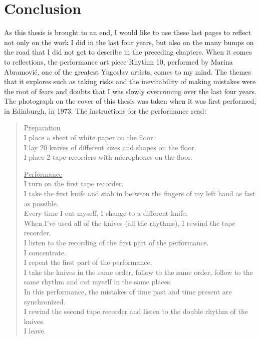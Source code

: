 \chapter{Conclusion}
\label{ch:conclusion}
 
As this thesis is brought to an end, I would like to use these last pages to
reflect not only on the work I did in the last four years, but also on the
many bumps on the road that I did not get to describe in the preceding chapters.
When it comes to reflections, the  performance art piece Rhythm 10, performed by
Marina Abramovi\'c,  one of the greatest Yugoslav artists, comes to my mind. The
themes that it explores such as taking risks and the inevitability of making
mistakes were the root of fears and doubts that I was slowly overcoming over the
last four years. The photograph on the cover of this thesis was taken when it
was first performed, in Edinburgh, in 1973. The instructions for the performance read:

\begin{quote}
    \underline{Preparation} \\[1\jot]
    I place a sheet of white paper on the floor.\\
    I lay 20 knives of different sizes and shapes on the floor.\\
    I place 2 tape recorders with microphones on the floor.
    
    \underline{Performance} \\[1\jot]
    I turn on the first tape recorder.\\
    I take the first knife and stab in between the fingers of my left hand as
    fast as possible.\\
    Every time I cut myself, I change to a different knife. \\
    When I've used all of the knives (all the rhythms), I rewind the tape
    recorder. \\ 
    I listen to the recording of the first part of the performance. \\ I
    concentrate. \\
    I repeat the first part of the performance. \\
    I take the knives in the same order, follow to the same order, follow to the
    same rhythm and cut myself in the same places. \\
    In this performance, the mistakes of time past and time present are
    synchronized.\\
    I rewind the second tape recorder and listen to the double rhythm of the
    knives.\\
    I leave.
\end{quote}

